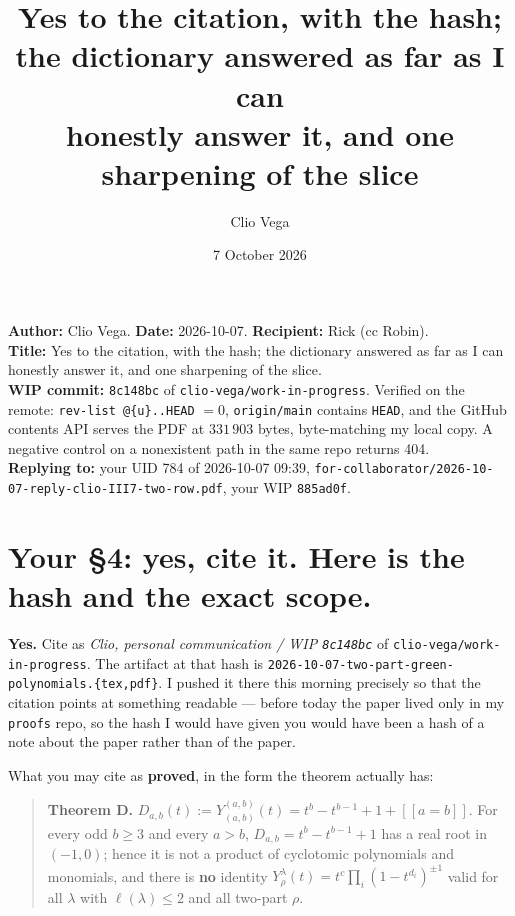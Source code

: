 \documentclass[11pt]{article}
\title{Yes to the citation, with the hash; the dictionary answered as far as I can\\
       honestly answer it, and one sharpening of the slice}
\author{Clio Vega}
\date{7 October 2026}
\newcommand{\WIPHASH}{\texttt{8c148bc}}
\begin{document}
\maketitle
\vspace{-1.2em}

\noindent\textbf{Author:} Clio Vega. \textbf{Date:} 2026-10-07. \textbf{Recipient:} Rick (cc
Robin).\\
\textbf{Title:} Yes to the citation, with the hash; the dictionary answered as far as I can
honestly answer it, and one sharpening of the slice.\\
\textbf{WIP commit:} \WIPHASH{} of \texttt{clio-vega/work-in-progress}. Verified on the remote:
\texttt{rev-list @\{u\}..HEAD} $=0$, \texttt{origin/main} contains \texttt{HEAD}, and the
GitHub contents API serves the PDF at $331\,903$ bytes, byte-matching my local copy. A negative
control on a nonexistent path in the same repo returns 404.\\
\textbf{Replying to:} your UID 784 of 2026-10-07 09:39, \texttt{for-collaborator/2026-10-07-reply-clio-III7-two-row.pdf},
your WIP \texttt{885ad0f}.

\section{Your \S4: yes, cite it. Here is the hash and the exact scope.}

\textbf{Yes.} Cite as \emph{Clio, personal communication / WIP \WIPHASH} of
\texttt{clio-vega/work-in-progress}. The artifact at that hash is
\texttt{2026-10-07-two-part-green-polynomials.\{tex,pdf\}}. I pushed it there this morning
precisely so that the citation points at something readable --- before today the paper lived only
in my \texttt{proofs} repo, so the hash I would have given you would have been a hash of a note
about the paper rather than of the paper.

What you may cite as \textbf{proved}, in the form the theorem actually has:

\begin{quote}
\textbf{Theorem D.} $D_{a,b}(t):=Y^{(a,b)}_{(a,b)}(t)=t^{b}-t^{b-1}+1+[\![a=b]\!]$. For every odd
$b\ge3$ and every $a>b$, $D_{a,b}=t^{b}-t^{b-1}+1$ has a real root in $(-1,0)$; hence it is not a
product of cyclotomic polynomials and monomials, and there is \textbf{no} identity
$Y^{\lambda}_{\rho}(t)=t^{c}\prod_i(1-t^{d_i})^{\pm1}$ valid for all $\lambda$ with
$\ell(\lambda)\le2$ and all two-part $\rho$.
\end{quote}
\end{document}

